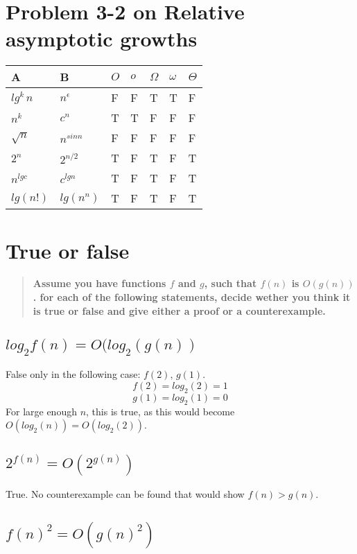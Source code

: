 \documentclass[titlepage]{article}\usepackage[]{graphicx}\usepackage[]{color}
\begin{document}
\section{ Problem 3-2 on Relative asymptotic growths}
\begin{table}[h]
  \begin{tabular}{ll|l|l|l|l|l}
	A & B  & $O$  & $o$  & $\Omega$  & $\omega$  & $\Theta$  \\ \hline	
	$lg^k\,n$ &  $n^\epsilon$   & F  & F  & T   &T  &F  \\ \hline	
	$n^k$     & $c^n$  & T & T  &F  &F  &F  \\ \hline	
	$\sqrt{n}$ & $n^{sin n}$  & F  &  F &  F &  F &  F \\ \hline	
	$2^n$  & $2^{n/2}$   & T &F  & T  & F  & T  \\ \hline	
	$n^{lg c}$ & $c^{lg n}$ & T  & F & T  & F  & T  \\ \hline	
	$lg(n!)$ & $lg(n^n)$ &T   & F  &T  &F  & T  
  \end{tabular}
\end{table}


\section{ True or false }
\begin{quote}
	\bf{Assume you have functions $f$ and $g$, such that $f(n)$ is $O(g(n))$.
  for each of the following statements, decide wether you think it is true or false and give
either a proof or a counterexample. }
\end{quote}

\subsection{ $log_2f(n) = O(log_2(g(n))$}
False only in the following case: $f(2),\, g(1)$.
\[ f(2) = log_2(2) = 1 \]
\[ g(1) = log_2(1) = 0 \]
For large enough $n$, this is true, as this would become $O(log_2(n)) =
O(log_2(2))$. 

\subsection{ $2^{ f(n) } = O(2^{ g(n) })$}
True. No counterexample can be found that would show $f(n) > g(n)$. 

\subsection{$  f(n)^2 = O(g(n)^2)$}
\end{document}
